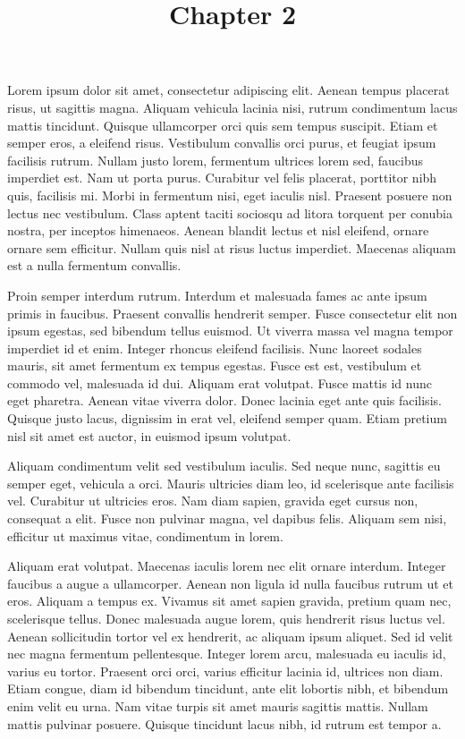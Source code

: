 \documentclass{article}
\begin{document}
\title{Chapter 2}

\maketitle


Lorem ipsum dolor sit amet, consectetur adipiscing elit. Aenean tempus placerat risus, ut sagittis magna. Aliquam vehicula lacinia nisi, rutrum condimentum lacus mattis tincidunt. Quisque ullamcorper orci quis sem tempus suscipit. Etiam et semper eros, a eleifend risus. Vestibulum convallis orci purus, et feugiat ipsum facilisis rutrum. Nullam justo lorem, fermentum ultrices lorem sed, faucibus imperdiet est. Nam ut porta purus. Curabitur vel felis placerat, porttitor nibh quis, facilisis mi. Morbi in fermentum nisi, eget iaculis nisl. Praesent posuere non lectus nec vestibulum. Class aptent taciti sociosqu ad litora torquent per conubia nostra, per inceptos himenaeos. Aenean blandit lectus et nisl eleifend, ornare ornare sem efficitur. Nullam quis nisl at risus luctus imperdiet. Maecenas aliquam est a nulla fermentum convallis.


Proin semper interdum rutrum. Interdum et malesuada fames ac ante ipsum primis in faucibus. Praesent convallis hendrerit semper. Fusce consectetur elit non ipsum egestas, sed bibendum tellus euismod. Ut viverra massa vel magna tempor imperdiet id et enim. Integer rhoncus eleifend facilisis. Nunc laoreet sodales mauris, sit amet fermentum ex tempus egestas. Fusce est est, vestibulum et commodo vel, malesuada id dui. Aliquam erat volutpat. Fusce mattis id nunc eget pharetra. Aenean vitae viverra dolor. Donec lacinia eget ante quis facilisis. Quisque justo lacus, dignissim in erat vel, eleifend semper quam. Etiam pretium nisl sit amet est auctor, in euismod ipsum volutpat.


Aliquam condimentum velit sed vestibulum iaculis. Sed neque nunc, sagittis eu semper eget, vehicula a orci. Mauris ultricies diam leo, id scelerisque ante facilisis vel. Curabitur ut ultricies eros. Nam diam sapien, gravida eget cursus non, consequat a elit. Fusce non pulvinar magna, vel dapibus felis. Aliquam sem nisi, efficitur ut maximus vitae, condimentum in lorem.


Aliquam erat volutpat. Maecenas iaculis lorem nec elit ornare interdum. Integer faucibus a augue a ullamcorper. Aenean non ligula id nulla faucibus rutrum ut et eros. Aliquam a tempus ex. Vivamus sit amet sapien gravida, pretium quam nec, scelerisque tellus. Donec malesuada augue lorem, quis hendrerit risus luctus vel. Aenean sollicitudin tortor vel ex hendrerit, ac aliquam ipsum aliquet. Sed id velit nec magna fermentum pellentesque. Integer lorem arcu, malesuada eu iaculis id, varius eu tortor. Praesent orci orci, varius efficitur lacinia id, ultrices non diam. Etiam congue, diam id bibendum tincidunt, ante elit lobortis nibh, et bibendum enim velit eu urna. Nam vitae turpis sit amet mauris sagittis mattis. Nullam mattis pulvinar posuere. Quisque tincidunt lacus nibh, id rutrum est tempor a.
\end{document}
